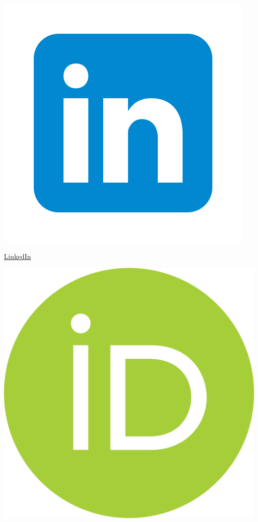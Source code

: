 \documentclass[letter,20pt]{article}
\begin{document}
\begin{minipage}[t]{0.45\textwidth}
  \parbox{0.5cm}{\includegraphics[scale=0.028]{linkedin4}}
  \parbox{3cm}{\href{https://www.linkedin.com/in/morteza-kolivandi-a50b94207/}{LinkedIn}}\par
  \parbox{0.5cm}{\includegraphics[scale=0.011]{orcid}}

\end{minipage}
\end{document}
